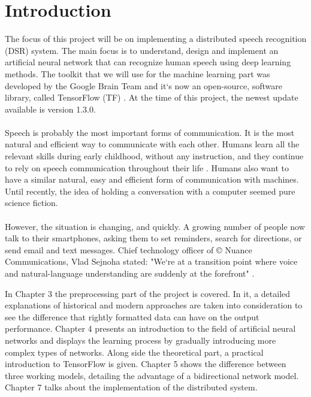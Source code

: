 \chapter{Introduction}\label{ch:introduction}

The focus of this project will be on implementing a distributed speech recognition (DSR) system.
The main focus is to understand, design and implement an artificial neural network that can recognize human speech using deep learning methods.
The toolkit that we will use for the machine learning part was developed by the Google Brain Team and it`s now an open-source, software library, called TensorFlow (TF) \cite{tensorflow2015-whitepaper}.
At the time of this project, the newest update available is version 1.3.0.\\\\
Speech is probably the most important forms of communication.
It is the most natural and efficient way to communicate with
each other. Humans learn all the relevant skills during early
childhood, without any instruction, and they continue to rely
on speech communication throughout their life \cite{kamblespeech}.
Humans also want to have a similar natural, easy and efficient form of communication with machines. 
Until recently, the idea of holding a conversation with a computer seemed pure science fiction.\\\\
However, the situation is changing, and quickly.
A growing number of people now talk to their smartphones, asking them to set reminders, search for directions, or send email and text messages.
Chief technology officer of \copyright{} Nuance Communications, Vlad Sejnoha stated: "We`re at a transition point where voice and natural-language understanding are suddenly at the forefront" \cite{kamblespeech}.

In Chapter 3 the preprocessing part of the project is covered. In it, a detailed explanations of historical and modern approaches are taken into consideration to see the difference that rightly formatted data can have on the output performance.
Chapter 4 presents an introduction to the field of artificial neural networks and displays the learning process by gradually introducing more complex types of networks. Along side the theoretical part, a practical introduction to TensorFlow is given. Chapter 5 shows the difference between three working models, detailing the advantage of a bidirectional network model. Chapter 7 talks about the implementation of the distributed system.